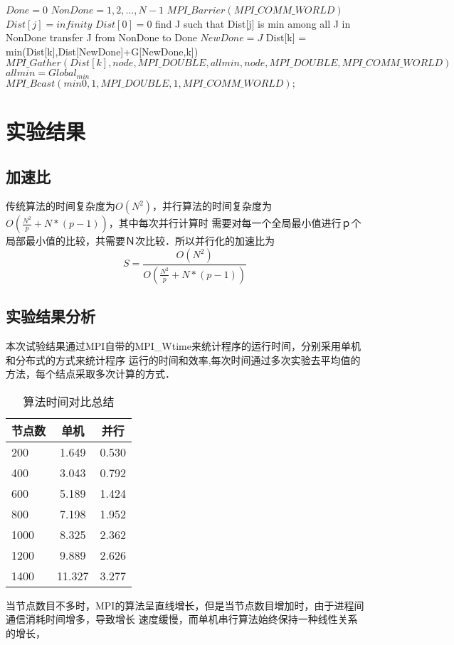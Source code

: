 \begin{algorithmic}
\State $Done = {0}$
\State $NonDone = {1,2,\ldots,N-1}$
\State $MPI\_Barrier(MPI\_COMM\_WORLD)$
 \State $Dist[j]=infinity$ \EndFor
\State $Dist[0]=0$
    \State find J such that Dist[j] is min among all J in NonDone
    \State transfer J from NonDone to Done
    \State $NewDone = J$
            \State Dist[k] = min(Dist[k],Dist[NewDone]+G[NewDone,k])
        \EndIf
    \EndFor
\EndFor
{}
\State ${MPI\_Gather(Dist[k],node,MPI\_DOUBLE,allmin,node,MPI\_DOUBLE,MPI\_COMM\_WORLD)} $
\EndIf
{}
\State $allmin=Global_{min}$
\EndFor
\State $MPI\_Bcast(min0,1,MPI\_DOUBLE,1,MPI\_COMM\_WORLD);$


\end{algorithmic}

\section{实验结果}
\subsection{加速比}
    传统算法的时间复杂度为$O(N^2)$，并行算法的时间复杂度为$O(\frac{N^2}{p}+N*(p-1))$，其中每次并行计算时
需要对每一个全局最小值进行ｐ个局部最小值的比较，共需要Ｎ次比较．所以并行化的加速比为
    $$S=\frac{O(N^2)}{O(\frac{N^2}{p}+N*(p-1))}$$
\subsection{实验结果分析}
    本次试验结果通过MPI自带的MPI\_Wtime{}来统计程序的运行时间，分别采用单机和分布式的方式来统计程序
运行的时间和效率,每次时间通过多次实验去平均值的方法，每个结点采取多次计算的方式．
    \begin{table}[htbp]
    \centering  %
    \begin{tabular}{lcc}  %
    \hline
    节点数&单机&并行\\ \hline  %
    200&1.649&0.530 \\
    400&3.043&0.792 \\
    600&5.189&1.424 \\
    800&7.198&1.952 \\
    1000&8.325&2.362 \\
    1200&9.889&2.626 \\
    1400&11.327&3.277 \\ \hline
    \end{tabular}
    \caption{算法时间对比总结}
    \end{table}

当节点数目不多时，MPI的算法呈直线增长，但是当节点数目增加时，由于进程间通信消耗时间增多，导致增长
速度缓慢，而单机串行算法始终保持一种线性关系的增长，


